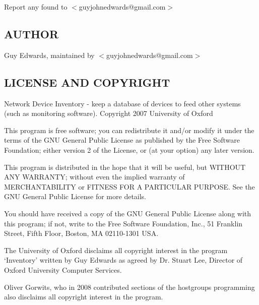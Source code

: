 \documentclass{book}
\begin{document}
Report any found to $<$guyjohnedwards@gmail.com$>$


\subsection{AUTHOR}
\label{Inventory::Invoices_AUTHOR}
\hypertarget{Inventory::Invoices_AUTHOR}{}



Guy Edwards, maintained by $<$guyjohnedwards@gmail.com$>$


\subsection{LICENSE AND COPYRIGHT}
\label{Inventory::Invoices_LICENSE_AND_COPYRIGHT}
\hypertarget{Inventory::Invoices_LICENSE_AND_COPYRIGHT}{}



Network Device Inventory - keep a database of devices to feed other systems (such as monitoring software). Copyright 2007 University of Oxford



This program is free software; you can redistribute it and/or modify it under the terms of the GNU General Public License as published by the Free Software Foundation; either version 2 of the License, or (at your option) any later version.



This program is distributed in the hope that it will be useful, but WITHOUT ANY WARRANTY; without even the implied warranty of MERCHANTABILITY or FITNESS FOR A PARTICULAR PURPOSE. See the GNU General Public License for more details.



You should have received a copy of the GNU General Public License along with this program; if not, write to the Free Software Foundation, Inc., 51 Franklin Street, Fifth Floor, Boston, MA 02110-1301 USA.



The University of Oxford disclaims all copyright interest in the program `Inventory' written by Guy Edwards as agreed by Dr. Stuart Lee, Director of Oxford University Computer Services.



Oliver Gorwits, who in 2008 contributed sections of the hostgroups programming also disclaims all copyright interest in the program.
\end{document}
